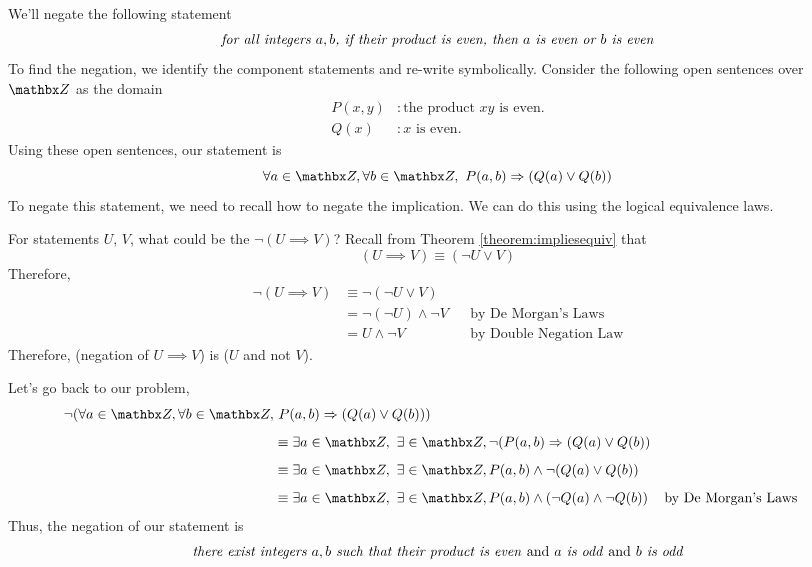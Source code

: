 \vspace*{1em}

\begin{example}
We'll negate the following statement
\[\emph{for all integers $a,b$, if their product is even, then $a$ is even or $b$ is even}\]
To find the negation, we identify the component statements and re-write symbolically. Consider the following open sentences over $\zz$ as the domain
\begin{align*}
P(x,y)&:\text{the product $xy$ is even.}\\[0.5em]
Q(x)&:\text{$x$ is even.}
\end{align*}
Using these open sentences, our statement is
\[\forall a\in \zz,\forall b \in \zz,\ P(a,b) \implies (Q(a) \vee Q(b))\]\newpage
To negate this statement, we need to recall how to negate the implication. We can do this using the logical equivalence laws.\\[0.25em]
\begin{subproof}
For statements $U,\,V$, what could be the $\neg(U \implies V)$? Recall from Theorem \ref{theorem:impliesequiv} that
\[(U \implies V) \equiv (\neg U \vee V)\]
Therefore,
\begin{align*}
\neg(U \implies V) &\equiv \neg(\neg U \vee V)\\[0.5em]
 &= \neg(\neg U) \wedge \neg V && \text{by De Morgan's Laws}\\[0.5em]
 &= U \wedge \neg V && \text{by Double Negation Law}
\end{align*}
Therefore, (negation of $U \implies V$) is ($U$ and not $V$).
\end{subproof}
\vspace*{1em}
Let's go back to our problem,
\begin{align*}
\neg(\forall a\in \zz,\forall b \in \zz,&\ P(a,b) \implies (Q(a) \vee Q(b)))\\[0.5em]
&\equiv \exists a \in \zz,\ \exists \in \zz, \neg(P(a,b) \implies (Q(a) \vee Q(b))\\[0.5em]
&\equiv \exists a \in \zz,\ \exists \in \zz, P(a,b) \wedge \neg(Q(a) \vee Q(b))\\[0.5em]
&\equiv \exists a \in \zz,\ \exists \in \zz, P(a,b) \wedge (\neg Q(a) \wedge \neg Q(b)) && \text{by De Morgan's Laws}
\end{align*}
Thus, the negation of our statement is
\[\emph{there exist integers $a,b$ such that their product is even \emph{and} $a$ is odd \emph{and} $b$ is odd}\]
\end{example}